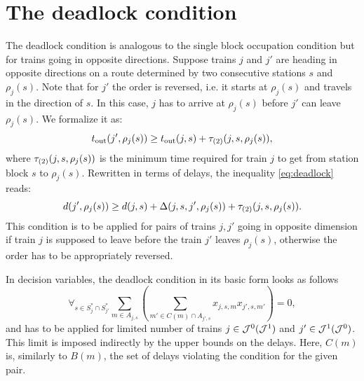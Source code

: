 \section{The deadlock condition}
The deadlock condition is analogous to the single block occupation condition
but for trains going in opposite directions. Suppose trains $j$ and $j'$ are
heading in opposite directions on a route determined by two consecutive
stations $s$ and $\rho_j(s)$. Note that for $j'$ the order is reversed, i.e. it
starts at $\rho_j(s)$ and travels in the direction of $s$. In this case, $j$
has to arrive at $\rho_j(s)$ before $j'$ can leave $\rho_j(s)$. We formalize it
as:
\begin{equation}
  \label{eq:deadlock}
  t_\text{out}(j', \rho_j(s)) \ge t_\text{out}(j,s) + \tau_{(2)}(j, s, \rho_j(s)),
\end{equation}
where $\tau_{(2)}(j, s, \rho_j(s))$ is the minimum time required for train $j$ to
get from station block $s$ to $\rho_{j}(s)$. Rewritten in terms of delays, the
inequality \eqref{eq:deadlock} reads:
\begin{equation}
  \label{eq:deadlock2}
  d(j',\rho_j(s)) \ge d(j, s) + \Delta(j,s,j',\rho_j(s)) + \tau_{(2)}(j, s, \rho_j(s)).
\end{equation}
This condition is to be applied for pairs of trains $j,j'$ going in opposite
dimension if train $j$ is supposed to leave before the train $j'$ leaves
$\rho_{j}(s)$, otherwise the order has to be appropriately reversed.

In decision variables, the deadlock condition in its basic form looks as
follows
\begin{equation}
  \label{eq:qubo:deadlock}
  \forall_{s \in S^{*}_{j} \cap S^{*}_{j'}} \sum_{m \in A_{j, s}} \left(
  \sum_{m' \in C(m) \cap A_{j', s}} x_{j,s,m}x_{j',s,m'}
  \right) = 0,
\end{equation}
and has to be applied for limited number of trains $j \in \mathcal{J}^{0} (\mathcal{J}^{1})$
and $j' \in \mathcal{J}^{1}(\mathcal{J}^{0})$. This limit is imposed indirectly by the upper
bounds on the delays. Here, $C(m)$ is, similarly to $B(m)$, the set of delays
violating the condition for the given pair.
